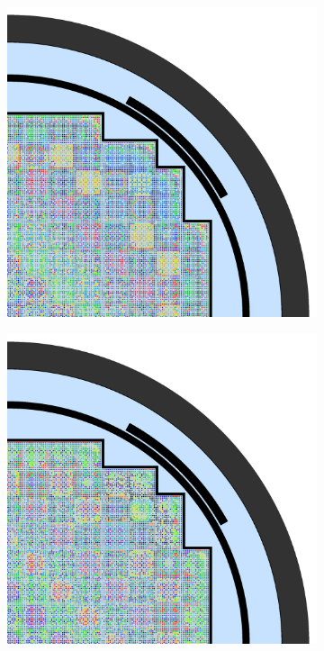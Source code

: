 \begin{figure}[h!]
\centering
\begin{subfigure}{0.67\textwidth}
  \centering
  \includegraphics[width=\linewidth]{figures/unsupervised/geometries/with-features/32-clusters/pinch/full-core}
  \caption{}
  \label{fig:chap10-full-core-pinch-32}
\end{subfigure}
\begin{subfigure}{0.67\textwidth}
  \centering
  \includegraphics[width=\linewidth]{figures/unsupervised/geometries/with-features/32-clusters/combined/full-core}

\end{subfigure}
\end{figure}
